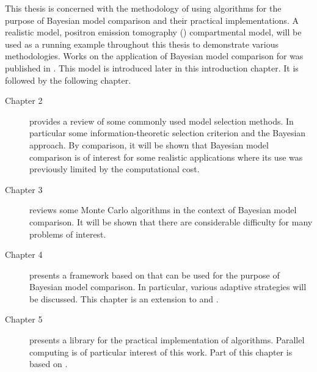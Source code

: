 This thesis is concerned with the methodology of using \smc algorithms for the
purpose of Bayesian model comparison and their practical implementations. A
realistic model, positron emission tomography (\pet) compartmental model, will
be used as a running example throughout this thesis to demonstrate various
methodologies. Works on the application of Bayesian model comparison for \pet
was published in \cite{Zhou2013}. This model is introduced later in this
introduction chapter. It is followed by the following chapter.
\begin{description}
  \item[Chapter 2] provides a review of some commonly used model selection
    methods. In particular some information-theoretic selection criterion and
    the Bayesian approach. By comparison, it will be shown that Bayesian model
    comparison is of interest for some realistic applications where its
    use was previously limited by the computational cost.
  \item[Chapter 3] reviews some Monte Carlo algorithms in the context of
    Bayesian model comparison. It will be shown that there are considerable
    difficulty for many problems of interest.
  \item[Chapter 4] presents a framework based on \smc that can be used for the
    purpose of Bayesian model comparison. In particular, various adaptive
    strategies will be discussed. This chapter is an extension to
    \cite{Zhou:2012uz} and \cite{Zhou:2013vx}.
  \item[Chapter 5] presents a \cpp library for the practical implementation of
    \smc algorithms. Parallel computing is of particular interest of this
    work. Part of this chapter is based on \cite{vsmcjss}.
\end{description}
